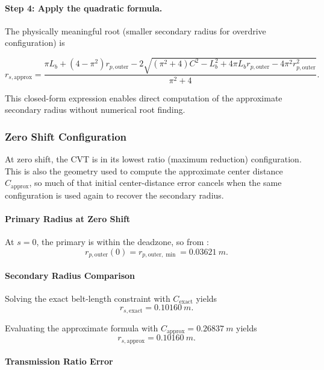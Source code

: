 \documentclass[11pt]{article}
\numberwithin{equation}{section}
\begin{document}
\paragraph{Step 4: Apply the quadratic formula.}

The physically meaningful root (smaller secondary radius for overdrive
configuration) is

\begin{equation}
\boxed{
r_{s,\mathrm{approx}}
=
\frac{
\pi L_b + (4 - \pi^2) r_{p,\text{outer}}
-
2\sqrt{(\pi^2 + 4)C^2 - L_b^2 + 4\pi L_b r_{p,\text{outer}} - 4\pi^2 r_{p,\text{outer}}^2}
}{
\pi^2 + 4
}.
}
\label{eq:rs_approx}
\end{equation}

This closed-form expression enables direct computation of the approximate
secondary radius without numerical root finding.

\subsubsection{Zero Shift Configuration}
\label{sec:approx_zeroshift}

At zero shift, the CVT is in its lowest ratio (maximum reduction)
configuration. This is also the geometry used to compute the approximate
center distance $C_{\mathrm{approx}}$, so much of that initial center-distance
error cancels when the same configuration is used again to recover the
secondary radius.

\paragraph{Primary Radius at Zero Shift}

At $s = 0$, the primary is within the deadzone, so from :
\[
r_{p,\text{outer}}(0) = r_{p,\text{outer},\min} = \SI{0.03621}{m}.
\]

\paragraph{Secondary Radius Comparison}

Solving the exact belt-length constraint with $C_{\mathrm{exact}}$ yields
\[
r_{s,\mathrm{exact}} = \SI{0.10160}{m}.
\]

Evaluating the approximate formula  with
$C_{\mathrm{approx}} = \SI{0.26837}{m}$ yields
\[
r_{s,\mathrm{approx}} = \SI{0.10160}{m}.
\]

\paragraph{Transmission Ratio Error}
\end{document}
